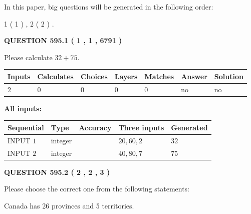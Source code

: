 \documentclass[12pt]{article}
\begin{document}
In this paper, big questions will be generated in the following order: 
   
   
   1 ( 1 )
 ,
   2 ( 2 )
 .
  
\vspace{0.2in}
  
{\textbf{\Large{QUESTION
595.1 
 ( 1 , 1 , 6791 )
}}}
  
  
 
Please calculate $ %
32 +  %
75 $.
 
 
   
   
   
   
\noindent\begin{tabular}{|l|l|l|l|l|l|l|}
 \hline
Inputs & Calculates & Choices & Layers & Matches & Answer & Solution \\ \hline
 2  & 
 0  & 
 0
  & 
 0  & 
 0  & 
  no & 
  no 
  \\ \hline
 \end{tabular}
   
   
   
   
\noindent{}
   
   
   
   
\noindent\vspace{0.1in}\hspace{-0.08in} {\textbf{\Large{All inputs: }}}
   
   
  
  
\noindent\begin{tabular}{|l|l|l|l|l|}
\hline
 Sequential & Type & Accuracy & Three inputs & Generated \\ 
\hline
 
 
  INPUT $  1 $ & integer &  & $
 20
 , 
 60
 , 
 2
 $ & $ 32 $ 
 \\  \hline  
 
 
  INPUT $  2 $ & integer &  & $
 40
 , 
 80
 , 
 7
 $ & $ 75 $ 
 \\  \hline  
 \end{tabular}
   
   
  
\vspace{0.2in}
  
{\textbf{\Large{QUESTION
595.2 
 ( 2 , 2 , 3 )
}}}
  
  
Please choose the correct one from the following statements:
 
 
Canada has  26 provinces and  5 territories.
 
\end{document}
